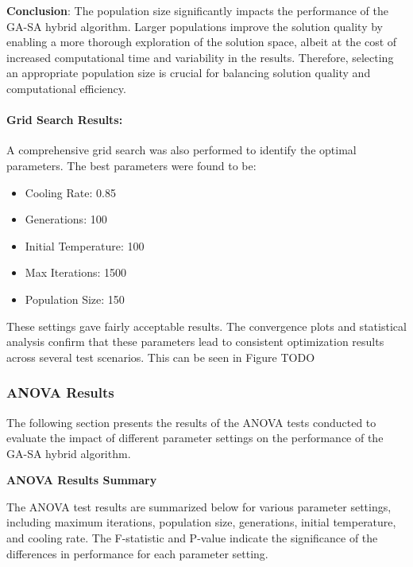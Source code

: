 \documentclass[
]{article}
\begin{document}
    \textbf{Conclusion}: The population size significantly impacts the performance of the GA-SA hybrid algorithm. Larger populations improve the solution quality by enabling a more thorough exploration of the solution space, albeit at the cost of increased computational time and variability in the results. Therefore, selecting an appropriate population size is crucial for balancing solution quality and computational efficiency.

    \paragraph{Grid Search Results:}
    A comprehensive grid search was also performed to identify the optimal parameters.
    The best parameters were found to be:
    \begin{itemize}
        \item Cooling Rate: 0.85
        \item Generations: 100
        \item Initial Temperature: 100
        \item Max Iterations: 1500
        \item Population Size: 150
    \end{itemize}
    These settings gave fairly acceptable results. The convergence plots and statistical analysis confirm that these parameters lead to consistent optimization results across several test scenarios. This can be seen in Figure TODO

    \subsubsection{ANOVA Results}

    The following section presents the results of the ANOVA tests conducted to evaluate the impact of different parameter settings on the performance of the GA-SA hybrid algorithm.

    \textbf{ANOVA Results Summary}

    The ANOVA test results are summarized below for various parameter settings, including maximum iterations, population size, generations, initial temperature, and cooling rate. The F-statistic and P-value indicate the significance of the differences in performance for each parameter setting.
\end{document}
